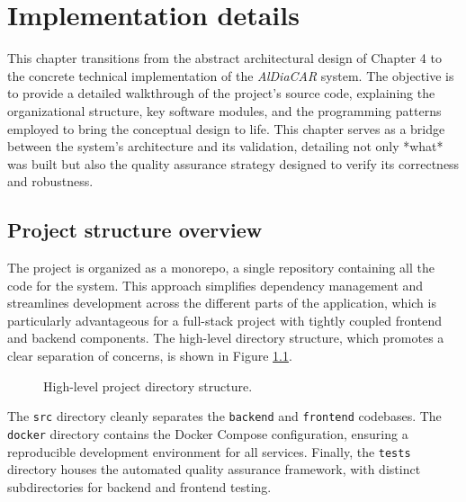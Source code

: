 \chapter{Implementation details}

This chapter transitions from the abstract architectural design of Chapter 4 to the concrete technical implementation of the \textit{AlDiaCAR} system. The objective is to provide a detailed walkthrough of the project's source code, explaining the organizational structure, key software modules, and the programming patterns employed to bring the conceptual design to life. This chapter serves as a bridge between the system's architecture and its validation, detailing not only *what* was built but also the quality assurance strategy designed to verify its correctness and robustness.

\section{Project structure overview}

The project is organized as a monorepo, a single repository containing all the code for the system. This approach simplifies dependency management and streamlines development across the different parts of the application, which is particularly advantageous for a full-stack project with tightly coupled frontend and backend components. The high-level directory structure, which promotes a clear separation of concerns, is shown in Figure \ref{fig:dirtree}.

\begin{figure}[h!]
\caption{High-level project directory structure.}
\label{fig:dirtree}
\end{figure}

The \texttt{src} directory cleanly separates the \texttt{backend} and \texttt{frontend} codebases. The \texttt{docker} directory contains the Docker Compose configuration, ensuring a reproducible development environment for all services. Finally, the \texttt{tests} directory houses the automated quality assurance framework, with distinct subdirectories for backend and frontend testing.

